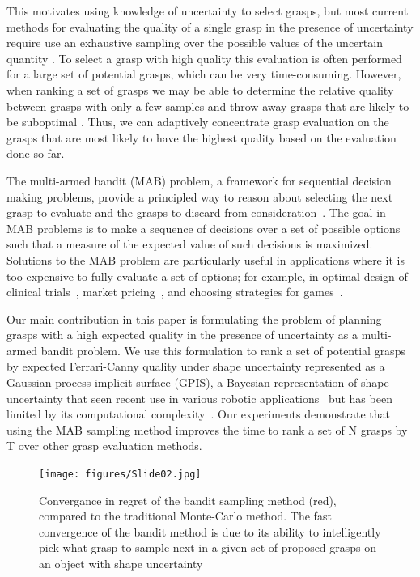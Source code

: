 \documentclass[letterpaper, 10 pt, conference]{ieeeconf}  %
\begin{document}
This motivates using knowledge of uncertainty to select grasps, but most current methods for evaluating the quality of a single grasp in the presence of uncertainty require use an exhaustive sampling over the possible values of the uncertain quantity \cite{kehoe2012toward, kim2012physically, weisz2012pose}.
To select a grasp with high quality this evaluation is often performed for a large set of potential grasps, which can be very time-consuming.
However, when ranking a set of grasps we may be able to determine the relative quality between grasps with only a few samples and throw away grasps that are likely to be suboptimal \cite{kehoe2012estimating}.
Thus, we can adaptively concentrate grasp evaluation on the grasps that are most likely to have the highest quality based on the evaluation done so far.

The multi-armed bandit (MAB) problem, a framework for sequential decision making problems, provide a principled way to reason about selecting the next grasp to evaluate and the grasps to discard from consideration~\cite{barto1998reinforcement, lai1985asymptotically, robbins1985some}.
The goal in MAB problems is to make a sequence of decisions over a set of possible options such that a measure of the expected value of such decisions is maximized.
Solutions to the MAB problem are particularly useful in applications where it is too expensive to fully evaluate a set of options; for example, in optimal design of clinical trials~\cite{simon1989optimal}, market pricing~\cite{rothschild1974two}, and choosing strategies for games~\cite{st2012online}.


Our main contribution in this paper is formulating the problem of planning grasps with a high expected quality in the presence of uncertainty as a multi-armed bandit problem.
We use this formulation to rank a set of potential grasps by expected Ferrari-Canny quality under shape uncertainty represented as a Gaussian process implicit surface (GPIS), a Bayesian representation of shape uncertainty that seen recent use in various robotic applications~\cite{dragiev2011, hollinger2013} but has been limited by its computational complexity~\cite{rasmussen2006, williams2007}.
Our experiments demonstrate that using the MAB sampling method improves the time to rank a set of N grasps by T over other grasp evaluation methods.


\begin{figure}[t!]
\centering
\texttt{[image: figures/Slide02.jpg]}
\caption{\footnotesize
Convergance in regret of the bandit sampling method (red), compared to the traditional Monte-Carlo method. The fast convergence of the bandit method is due to its ability to intelligently pick what grasp to sample next in a given set of proposed grasps on an object with shape uncertainty}
\vspace*{-10pt}
\label{fig:noisy data}
\end{figure}
 
\end{document}
